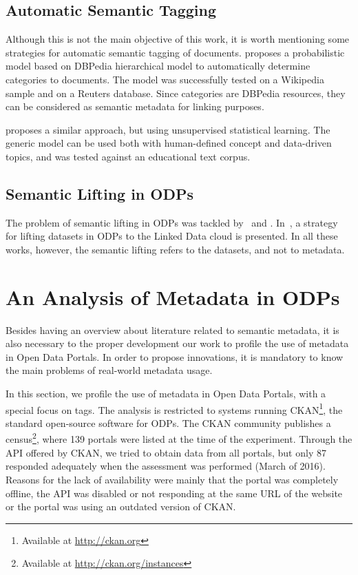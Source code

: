 \subsection{Automatic Semantic Tagging}
\label{sec:automatic_semtags}
Although this is not the main objective of this work, it is worth mentioning some strategies for automatic semantic tagging of documents.
 proposes a probabilistic model based on DBPedia hierarchical model to automatically determine categories to documents.
The model was successfully tested on a Wikipedia sample and on a Reuters database.
Since categories are DBPedia resources, they can be considered as semantic metadata for linking purposes.

 proposes a similar approach, but using unsupervised statistical learning.
The generic model can be used both with human-defined concept and data-driven topics, and was tested against an educational text corpus.

\subsection{Semantic Lifting in ODPs}
The problem of semantic lifting in ODPs was tackled by~ and . 
In~, a strategy for lifting datasets in ODPs to the Linked Data cloud is presented. 
In all these works, however, the semantic lifting refers to the datasets, and not to metadata.

\section{An Analysis of Metadata in ODPs}
\label{sec:analysis} 

Besides having an overview about literature related to semantic metadata, it is also necessary to the proper development our work to profile the use of metadata in Open Data Portals.
In order to propose innovations, it is mandatory to know the main problems of real-world metadata usage.

In this section, we profile the use of metadata in Open Data Portals, with a special focus on tags. 
The analysis is restricted to systems running CKAN\footnote{Available at \url{http://ckan.org}}, the standard open-source software for ODPs. 
The CKAN community publishes a census\footnote{Available at \url{http://ckan.org/instances}}, where 139 portals were listed at the time of the experiment. 
Through the API offered by CKAN, we tried to obtain data from all portals, but only 87 responded adequately when the assessment was performed (March of 2016).
Reasons for the lack of availability were mainly that the portal was completely offline, the API was disabled or not responding at the same URL of the website or the portal was using an outdated version of CKAN.

